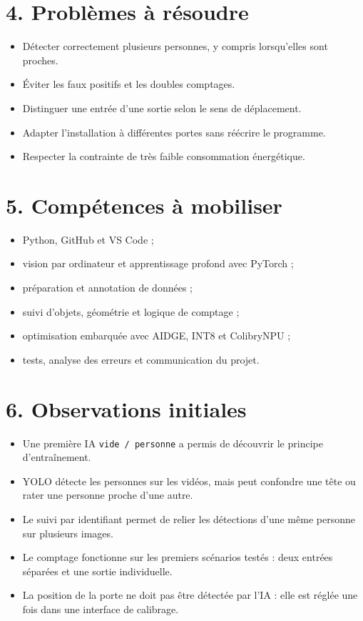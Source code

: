 \documentclass[11pt,a4paper]{article}
\begin{document}
\section*{4. Problèmes à résoudre}

\begin{itemize}
    \item Détecter correctement plusieurs personnes, y compris lorsqu'elles sont proches.
    \item Éviter les faux positifs et les doubles comptages.
    \item Distinguer une entrée d'une sortie selon le sens de déplacement.
    \item Adapter l'installation à différentes portes sans réécrire le programme.
    \item Respecter la contrainte de très faible consommation énergétique.
\end{itemize}

\section*{5. Compétences à mobiliser}

\begin{itemize}
    \item Python, GitHub et VS Code ;
    \item vision par ordinateur et apprentissage profond avec PyTorch ;
    \item préparation et annotation de données ;
    \item suivi d'objets, géométrie et logique de comptage ;
    \item optimisation embarquée avec AIDGE, INT8 et ColibryNPU ;
    \item tests, analyse des erreurs et communication du projet.
\end{itemize}

\section*{6. Observations initiales}

\begin{itemize}
    \item Une première IA \texttt{vide / personne} a permis de découvrir le principe d'entraînement.
    \item YOLO détecte les personnes sur les vidéos, mais peut confondre une tête ou rater une personne proche d'une autre.
    \item Le suivi par identifiant permet de relier les détections d'une même personne sur plusieurs images.
    \item Le comptage fonctionne sur les premiers scénarios testés : deux entrées séparées et une sortie individuelle.
    \item La position de la porte ne doit pas être détectée par l'IA : elle est réglée une fois dans une interface de calibrage.
\end{itemize}
\end{document}
